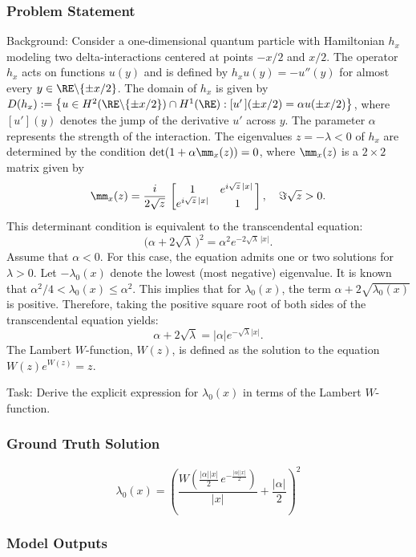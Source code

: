 \documentclass[10pt]{article}
\begin{document}
\subsubsection*{Problem Statement}
Background:
Consider a one-dimensional quantum particle with Hamiltonian $h_x$ modeling two delta-interactions centered at points $-x/2$ and $x/2$. The operator $h_x$ acts on functions $u(y)$ and is defined by $h_x u(y) = -u''(y)$ for almost every $y \in \RE\backslash \{\pm x/2\}$. The domain of $h_x$ is given by $D(h_x):= \big\{ u \in H^2(\RE\backslash\{\pm x/2\})\cap H^1(\RE): [u'\,](\pm x/2)=\alpha u(\pm x/2)\big\}$, where $[u'](y)$ denotes the jump of the derivative $u'$ across $y$. The parameter $\alpha$ represents the strength of the interaction. The eigenvalues $z=-\lambda < 0$ of $h_x$ are determined by the condition $\det(1+\alpha\mm_{x}(z)) =0$, where $\mm_x(z)$ is a $2\times2$ matrix given by
$$
\mm_x(z) = \frac{i}{2 \sqrt{z}}\,\begin{bmatrix}
 1&   e^{i\sqrt{z}\,|x|} \,\\
  e^{i\sqrt{z}\,|x|} & 1
\end{bmatrix}, \quad \Im \sqrt z>0.
$$
This determinant condition is equivalent to the transcendental equation:
$$
\big(\alpha+2\sqrt{\lambda}\,\big)^{2} =\alpha^{2}  e^{-2\sqrt{\lambda}\,|x|}.
$$
Assume that $\alpha < 0$. For this case, the equation admits one or two solutions for $\lambda > 0$. Let $-\lambda_0(x)$ denote the lowest (most negative) eigenvalue. It is known that $\alpha^2/4 < \lambda_0(x) \leq \alpha^2$. This implies that for $\lambda_0(x)$, the term $\alpha+2\sqrt{\lambda_0(x)}$ is positive. Therefore, taking the positive square root of both sides of the transcendental equation yields:
$$
\alpha+2\sqrt{\lambda} = |\alpha| e^{-\sqrt{\lambda}|x|}.
$$
The Lambert $W$-function, $W(z)$, is defined as the solution to the equation $W(z)e^{W(z)} = z$.

Task:
Derive the explicit expression for $\lambda_0(x)$ in terms of the Lambert $W$-function.

\subsubsection*{Ground Truth Solution}
\[ \boxed{\lambda_0(x) = \left(\frac{ W\left(\frac{|\alpha||x|}{2} \,e^{-\frac{|\alpha||x|}{2}} \right)}{|x|} + \frac{|\alpha|}{2}\right)^{\!\!2}} \]

\subsubsection*{Model Outputs}
\end{document}
